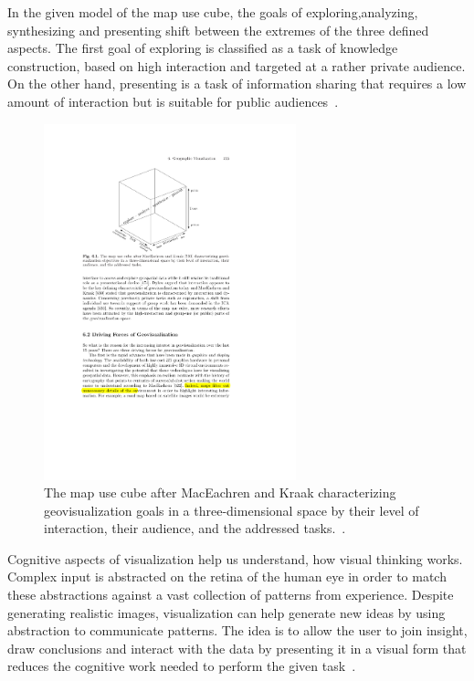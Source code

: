 In the given model of the map use cube, the goals of exploring,analyzing, synthesizing and presenting shift between the extremes of the three defined aspects. The first goal of exploring is classified as a task of knowledge construction, based on high interaction and targeted at a rather private audience. On the other hand, presenting is a task of information sharing that requires a low amount of interaction but is suitable for public audiences~\cite{noellenburg11geovis}.  

\begin{figure}[h]
  \begin{center}
    \includegraphics[width=0.65\textwidth]{figures/geovis_goals.pdf}
    \caption{The map use cube after MacEachren and Kraak \cite{MacEachren07cartovis} characterizing geovisualization goals in a three-dimensional space by their level of interaction, their audience, and the addressed tasks.~\cite{noellenburg11geovis}.}
    \label{fig:geovis-cube}
  \end{center}
\end{figure}


Cognitive aspects of visualization help us understand, how visual thinking works. Complex input is abstracted on the retina of the human eye in order to match these abstractions against a vast collection of patterns from experience. Despite generating realistic images, visualization can help generate new ideas by using abstraction to communicate patterns. The idea is to allow the user to join insight, draw conclusions and interact with the data by presenting it in a visual form that reduces the cognitive work needed to perform the given task~\cite{MACEACHREN90apattern, keim2001vis, noellenburg11geovis}. 


